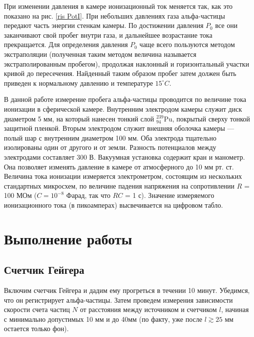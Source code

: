 \documentclass[12pt]{kiarticle} %
\begin{document}
	При изменении давления в камере ионизационный ток меняется так, как это показано на рис. \ref{ris PotI}. При небольших давлениях газа
	альфа-частицы передают часть энергии стенкам камеры. По достижении
	давления $ P_0 $ все они заканчивают свой пробег внутри газа, и дальнейшее возрастание тока прекращается. Для определения давления $ P_0 $ чаще всего пользуются методом экстраполяции (полученная таким методом величина называется экстраполированным пробегом), продолжая наклонный и горизонтальный участки кривой до пересечения. Найденный таким образом пробег затем должен быть приведен к нормальному давлению и температуре $ 15 ^\circ C $.
	
	В данной работе измерение пробега альфа-частицы проводится по величине тока ионизации в сферической камере. Внутренним электродом
	камеры служит диск диаметром 5 мм, на который нанесен тонкий слой $ ^{239}_{94} $Pu, покрытый сверху тонкой защитной пленкой. Вторым электродом служит внешняя оболочка камеры --- полый шар с внутренним
	диаметром 100 мм. Оба электрода тщательно изолированы один от
	другого и от земли. Разность потенциалов между электродами составляет 300 В. Вакуумная установка содержит кран и манометр. Она позволяет изменять давление в камере от атмосферного до 10 мм рт. ст.
	Величина тока ионизации измеряется электрометром, состоящим из
	нескольких стандартных микросхем, по величине падения напряжения
	на сопротивлении $ R $ = 100 МОм ($ C = 10^{-8} $ Фарад, так что $ RC $ = 1 с).
	Значение измеряемого ионизационного тока (в пикоамперах) высвечивается на цифровом табло.
	
	
	
	
	
	\section{Выполнение работы}
	
		\subsection{Счетчик Гейгера}
		
		Включим счетчик Гейгера и дадим ему прогреться в течении 10 минут. Убедимся, что он регистрирует альфа-частицы. Затем проведем измерения зависимости скорости счета частиц $ N $ от расстояния между источником и счетчиком $ l $, начиная с минимально допустимых 10 мм и до 40мм (по факту, уже после $ l \gtrsim 25 $ мм остается только фон).
		
\end{document}
